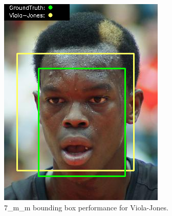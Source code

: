 \documentclass{l4proj}
\begin{document}
\begin{appendices}
\begin{figure}[h!]
\begin{minipage}{0.49\textwidth}
     \includegraphics[width=\textwidth]{images/appendix/viola/7.png}
    \caption{7\_m\_m bounding box performance for Viola-Jones.}
    \label{whoopi_result}
  \end{minipage}
\end{figure}


\end{appendices}
\end{document}

